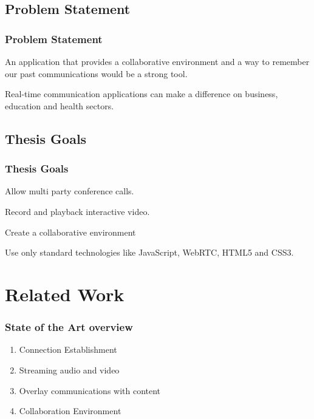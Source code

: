 \documentclass[compress]{beamer}
\begin{document}
	\subsection{Problem Statement} %
  		\begin{frame}[c]
		\frametitle{Problem Statement}
		
		An application that provides a collaborative environment and a way to remember our past communications would be a strong tool.
		
		\vfill

		Real-time communication applications can make a difference on business, education and health sectors.

		\end{frame}






		
	

	\subsection{Thesis Goals} %
  		\begin{frame}[c]
		\frametitle{Thesis Goals}
		Allow multi party conference calls.

		\vfill
		
		Record and playback interactive video.
		
		\vfill

        Create a collaborative environment        

        \vfill

		Use only standard technologies like JavaScript, WebRTC, HTML5 and CSS3.


		\end{frame}


\section{Related Work}\label{related}

	\begin{frame}[c]
			\frametitle{State of the Art overview}
	\begin{enumerate}
		\item Connection Establishment
		\item Streaming audio and video
		\item Overlay communications with content
		\item Collaboration Environment
	\end{enumerate}


	\end{frame}
\end{document}
